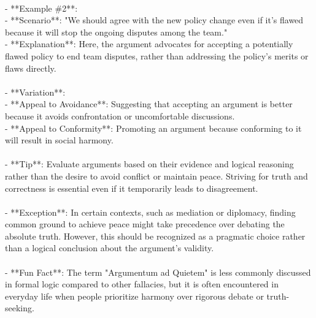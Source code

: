 \documentclass[a4paper,12pt,single,pdftex]{scrartcl}
\begin{document}
    \\

    
      - **Example \#2**:
    \\

    
        - **Scenario**: "We should agree with the new policy change even if it's flawed because it will stop the ongoing disputes among the team."
    \\

    
        - **Explanation**: Here, the argument advocates for accepting a potentially flawed policy to end team disputes, rather than addressing the policy's merits or flaws directly.
    \\

    
      
    \\

    
      - **Variation**:
    \\

    
        - **Appeal to Avoidance**: Suggesting that accepting an argument is better because it avoids confrontation or uncomfortable discussions.
    \\

    
        - **Appeal to Conformity**: Promoting an argument because conforming to it will result in social harmony.
    \\

    
      
    \\

    
      - **Tip**: Evaluate arguments based on their evidence and logical reasoning rather than the desire to avoid conflict or maintain peace. Striving for truth and correctness is essential even if it temporarily leads to disagreement.
    \\

    
      
    \\

    
      - **Exception**: In certain contexts, such as mediation or diplomacy, finding common ground to achieve peace might take precedence over debating the absolute truth. However, this should be recognized as a pragmatic choice rather than a logical conclusion about the argument's validity.
    \\

    
      
    \\

    
      - **Fun Fact**: The term "Argumentum ad Quietem" is less commonly discussed in formal logic compared to other fallacies, but it is often encountered in everyday life when people prioritize harmony over rigorous debate or truth-seeking.
    \\
\end{document}
